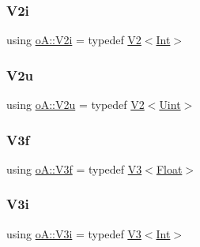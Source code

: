 \subsubsection{\texorpdfstring{V2i}{V2i}}
{\footnotesize\ttfamily using \mbox{\hyperlink{namespaceo_a_aeddbfac9ac1bbff3d9640251439b33aa}{o\+A\+::\+V2i}} = typedef \mbox{\hyperlink{structo_a_1_1_v2}{V2}}$<$\mbox{\hyperlink{namespaceo_a_aa575525a7b0116822c73d43fa671a58c}{Int}}$>$}

\mbox{\label{namespaceo_a_a20f57c861441be662b592b15a492f29e}} 
\subsubsection{\texorpdfstring{V2u}{V2u}}
{\footnotesize\ttfamily using \mbox{\hyperlink{namespaceo_a_a20f57c861441be662b592b15a492f29e}{o\+A\+::\+V2u}} = typedef \mbox{\hyperlink{structo_a_1_1_v2}{V2}}$<$\mbox{\hyperlink{namespaceo_a_abe1d8250226c5cf34f84d7b75fc7922e}{Uint}}$>$}

\mbox{\label{namespaceo_a_a795c21de788620b8fb6c14bf3046dcf9}} 
\subsubsection{\texorpdfstring{V3f}{V3f}}
{\footnotesize\ttfamily using \mbox{\hyperlink{namespaceo_a_a795c21de788620b8fb6c14bf3046dcf9}{o\+A\+::\+V3f}} = typedef \mbox{\hyperlink{structo_a_1_1_v3}{V3}}$<$\mbox{\hyperlink{namespaceo_a_a513e9cb16924b482268ab3fcdf1f2499}{Float}}$>$}

\mbox{\label{namespaceo_a_a1b5e3fb31926401708aa4000145a58ef}} 
\subsubsection{\texorpdfstring{V3i}{V3i}}
{\footnotesize\ttfamily using \mbox{\hyperlink{namespaceo_a_a1b5e3fb31926401708aa4000145a58ef}{o\+A\+::\+V3i}} = typedef \mbox{\hyperlink{structo_a_1_1_v3}{V3}}$<$\mbox{\hyperlink{namespaceo_a_aa575525a7b0116822c73d43fa671a58c}{Int}}$>$}

\mbox{\label{namespaceo_a_ae91b6ba950b8f72e43ee17b69dbfeaad}} 
